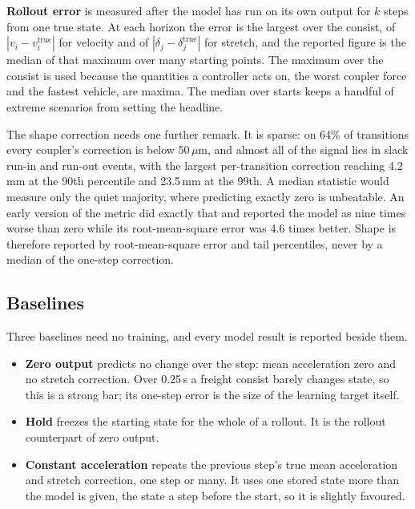 \textbf{Rollout error} is measured after the model has run on its own output for $k$ steps from one true state. At each horizon the error is the largest over the consist, of $|v_i - v_i^{\text{true}}|$ for velocity and of $|\delta_j - \delta_j^{\text{true}}|$ for stretch, and the reported figure is the median of that maximum over many starting points. The maximum over the consist is used because the quantities a controller acts on, the worst coupler force and the fastest vehicle, are maxima. The median over starts keeps a handful of extreme scenarios from setting the headline.

The shape correction needs one further remark. It is sparse: on 64\% of transitions every coupler's correction is below 50\,$\mu$m, and almost all of the signal lies in slack run-in and run-out events, with the largest per-transition correction reaching 4.2\,mm at the 90th percentile and 23.5\,mm at the 99th. A median statistic would measure only the quiet majority, where predicting exactly zero is unbeatable. An early version of the metric did exactly that and reported the model as nine times worse than zero while its root-mean-square error was 4.6 times better. Shape is therefore reported by root-mean-square error and tail percentiles, never by a median of the one-step correction.

\subsection{Baselines}

Three baselines need no training, and every model result is reported beside them.

\begin{itemize}
    \item \textbf{Zero output} predicts no change over the step: mean acceleration zero and no stretch correction. Over 0.25\,s a freight consist barely changes state, so this is a strong bar; its one-step error is the size of the learning target itself.
    \item \textbf{Hold} freezes the starting state for the whole of a rollout. It is the rollout counterpart of zero output.
    \item \textbf{Constant acceleration} repeats the previous step's true mean acceleration and stretch correction, one step or many. It uses one stored state more than the model is given, the state a step before the start, so it is slightly favoured.
\end{itemize}

